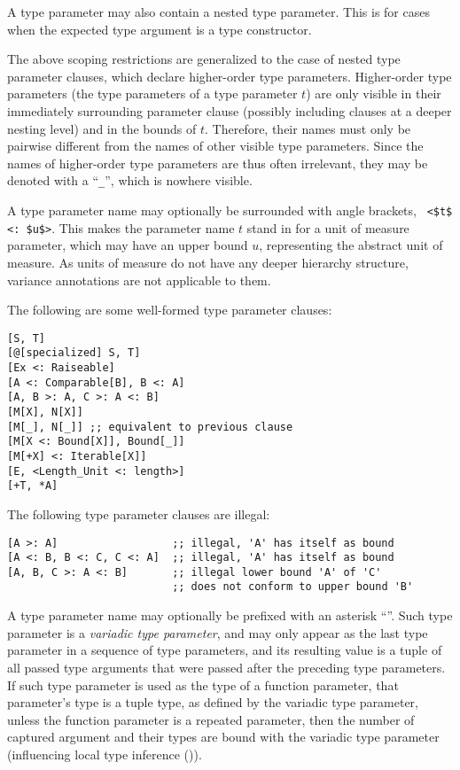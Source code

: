A type parameter may also contain a nested type parameter. This is for cases when the expected type argument is a type constructor. 

The above scoping restrictions are generalized to the case of nested type parameter clauses, which declare higher-order type parameters. Higher-order type parameters (the type parameters of a type parameter $t$) are only visible in their immediately surrounding parameter clause (possibly including clauses at a deeper nesting level) and in the bounds of $t$. Therefore, their names must only be pairwise different from the names of other visible type parameters. Since the names of higher-order type parameters are thus often irrelevant, they may be denoted with a ``\lstinline!_!'', which is nowhere visible. 

A type parameter name may optionally be surrounded with angle brackets, ~\lstinline!<$t$ <: $u$>!. This makes the parameter name $t$ stand in for a unit of measure parameter, which may have an upper bound $u$, representing the abstract unit of measure. As units of measure do not have any deeper hierarchy structure, variance annotations are not applicable to them. 

\example The following are some well-formed type parameter clauses:
\begin{lstlisting}
[S, T]
[@[specialized] S, T]
[Ex <: Raiseable]
[A <: Comparable[B], B <: A]
[A, B >: A, C >: A <: B]
[M[X], N[X]]
[M[_], N[_]] ;; equivalent to previous clause
[M[X <: Bound[X]], Bound[_]]
[M[+X] <: Iterable[X]]
[E, <Length_Unit <: length>]
[+T, *A]
\end{lstlisting}
The following type parameter clauses are illegal:
\begin{lstlisting}
[A >: A]                  ;; illegal, 'A' has itself as bound
[A <: B, B <: C, C <: A]  ;; illegal, 'A' has itself as bound
[A, B, C >: A <: B]       ;; illegal lower bound 'A' of 'C'
                          ;; does not conform to upper bound 'B'
\end{lstlisting}

A type parameter name may optionally be prefixed with an asterisk ``\code{*}''. Such type parameter is a {\em variadic type parameter}, and may only appear as the last type parameter in a sequence of type parameters, and its resulting value is a tuple of all passed type arguments that were passed after the preceding type parameters. If such type parameter is used as the type of a function parameter, that parameter's type is a tuple type, as defined by the variadic type parameter, unless the function parameter is a repeated parameter, then the number of captured argument and their types are bound with the variadic type parameter (influencing local type inference ()). 

